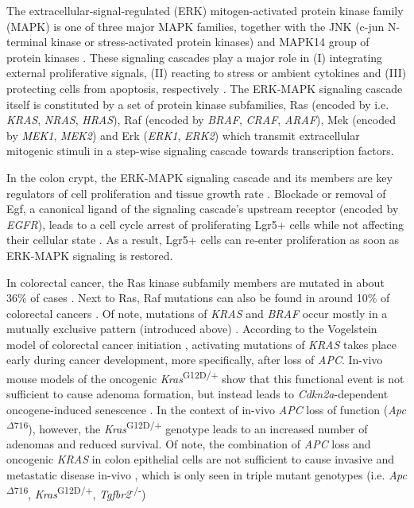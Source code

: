 \begin{flushleft}
The extracellular-signal-regulated (ERK) mitogen-activated protein kinase family (MAPK) is one of three major MAPK families, together with the JNK (c-jun N-terminal kinase or stress-activated protein kinases) and MAPK14 group of protein kinases \citep{zhangMAPKSignalPathways2002}. These signaling cascades play a major role in (I) integrating external proliferative signals, (II) reacting to stress or ambient cytokines and (III) protecting cells from apoptosis, respectively \citep{fangMAPKSignallingPathways2005}. The ERK-MAPK signaling cascade itself is constituted by a set of protein kinase subfamilies, Ras (encoded by i.e. \textit{KRAS}, \textit{NRAS}, \textit{HRAS}), Raf (encoded by \textit{BRAF}, \textit{CRAF}, \textit{ARAF}), Mek (encoded by \textit{MEK1}, \textit{MEK2}) and Erk (\textit{ERK1}, \textit{ERK2}) which transmit extracellular mitogenic stimuli in a step-wise signaling cascade towards transcription factors. \par

In the colon crypt, the ERK-MAPK signaling cascade and its members are key regulators of cell proliferation and tissue growth rate \citep{hTalesCryptNew2019}. Blockade or removal of Egf, a canonical ligand of the signaling cascade's upstream receptor (encoded by \textit{EGFR}), leads to a cell cycle arrest of proliferating Lgr5+ cells while not affecting their cellular state \citep{basakInducedQuiescenceLgr52017}. As a result, Lgr5+ cells can re-enter proliferation as soon as ERK-MAPK signaling is restored.
\par

In colorectal cancer, the Ras kinase subfamily members are mutated in about 36\% of cases \citep{fangMAPKSignallingPathways2005}. Next to Ras, Raf mutations can also be found in around 10\% of colorectal cancers \citep{fangMAPKSignallingPathways2005}. Of note, mutations of \textit{KRAS} and \textit{BRAF} occur mostly in a mutually exclusive pattern (introduced above) \citep{fangMAPKSignallingPathways2005, minaConditionalSelectionGenomic2017}. According to the Vogelstein model of colorectal cancer initiation \citep{fearonMolecularGeneticsColorectal2011}, activating mutations of \textit{KRAS} takes place early during cancer development, more specifically, after loss of \textit{APC}. In-vivo mouse models of the oncogenic \textit{Kras}\textsuperscript{G12D/+} show that this functional event is not sufficient to cause adenoma formation, but instead leads to \textit{Cdkn2a}-dependent oncogene-induced senescence \citep{benneckeInk4aArfOncogeneinduced2010}. In the context of in-vivo \textit{APC} loss of function (\textit{Apc}\textsuperscript{$\Delta716$}), however, the \textit{Kras}\textsuperscript{G12D/+} genotype leads to an increased number of adenomas and reduced survival. Of note, the combination of \textit{APC} loss and oncogenic \textit{KRAS} in colon epithelial cells are not sufficient to cause invasive and metastatic disease in-vivo \citep{sakaiCombinedMutationApc2018a}, which is only seen in triple mutant genotypes (i.e. \textit{Apc}\textsuperscript{$\Delta716$}, \textit{Kras}\textsuperscript{G12D/+}, \textit{Tgfbr2}\textsuperscript{-/-}) \citep{sakaiCombinedMutationApc2018a}




\end{flushleft}
